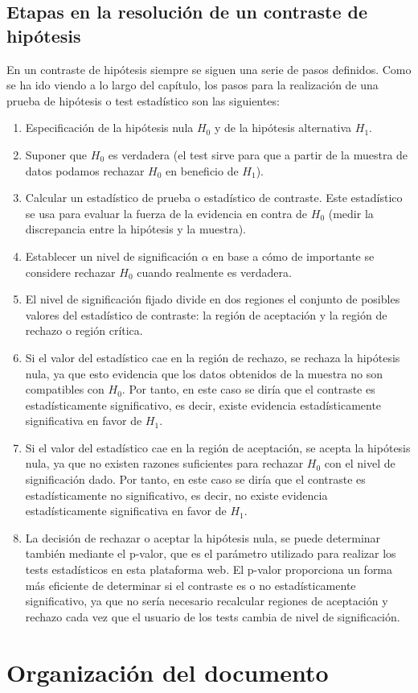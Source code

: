 \subsection{Etapas en la resolución de un contraste de hipótesis}
En un contraste de hipótesis siempre se siguen una serie de pasos definidos. Como se ha ido viendo a lo largo
del capítulo, los pasos para la realización de una prueba de hipótesis o test estadístico son las siguientes:
\begin{enumerate}
\item Especificación de la hipótesis nula $H_0$ y de la hipótesis alternativa $H_1$.
\item Suponer que $H_0$ es verdadera (el test sirve para que a partir de la muestra de datos podamos rechazar
$H_0$ en beneficio de $H_1$).
\item Calcular un estadístico de prueba o estadístico de contraste. Este estadístico se usa para evaluar la
fuerza de la evidencia en contra de $H_0$ (medir la discrepancia entre la hipótesis y la muestra).
\item Establecer un nivel de significación $\alpha$ en base a cómo de importante se considere rechazar $H_0$
cuando realmente es verdadera.
\item El nivel de significación fijado divide en dos regiones el conjunto de posibles valores del estadístico
de contraste: la región de aceptación y la región de rechazo o región crítica.
\item Si el valor del estadístico cae en la región de rechazo, se rechaza la hipótesis nula, ya que esto
evidencia que los datos obtenidos de la muestra no son compatibles con $H_0$. Por tanto, en este caso se diría
que el contraste es estadísticamente significativo, es decir, existe evidencia estadísticamente significativa en
favor de $H_1$.
\item Si el valor del estadístico cae en la región de aceptación, se acepta la hipótesis nula, ya que no existen
razones suficientes para rechazar $H_0$ con el nivel de significación dado. Por tanto, en este caso se diría
que el contraste es estadísticamente no significativo, es decir, no existe evidencia estadísticamente significativa
en favor de $H_1$.
\item La decisión de rechazar o aceptar la hipótesis nula, se puede determinar también mediante el p-valor,
que es el parámetro utilizado para realizar los tests estadísticos en esta plataforma web. El p-valor proporciona
un forma más eficiente de determinar si el contraste es o no estadísticamente significativo, ya que no sería
necesario recalcular regiones de aceptación y rechazo cada vez que el usuario de los tests cambia de nivel de
significación.
\end{enumerate}


\section{Organización del documento}
